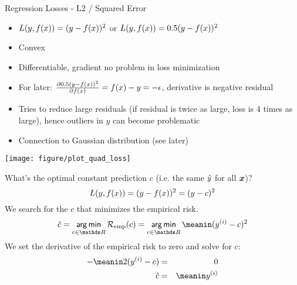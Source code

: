\begin{vbframe}{Regression Losses - L2 / Squared Error}
\begin{itemize}
\item $L(y, f(x)) = (y-f(x))^2$ or $L(y, f(x)) = 0.5 (y-f(x))^2$
\item Convex
\item Differentiable, gradient no problem in loss minimization
\item For later: $\frac{\partial{0.5 (y-f(x))^2}}{\partial f(x)} = f(x) - y = - \epsilon$, derivative is negative residual
\item Tries to reduce large residuals (if residual is twice as large, loss is 4 times as large), hence
  outliers in $y$ can become problematic
\item Connection to Gaussian distribution (see later)
\end{itemize}

\begin{knitrout}\scriptsize
{}\color{fgcolor}

{\centering \texttt{[image: figure/plot\_quad\_loss]} 
}



\end{knitrout}
\framebreak


What's the optimal constant prediction $c$ (i.e. the same $\hat{y}$ for all $\bm{x}$)?
$$L(y, f(x)) = (y-f(x))^2 = (y - c)^2$$
We search for the $c$ that minimizes the empirical risk.
$$  \hat{c} = \argmin_{c \in \R}\riske(c)  =  \argmin_{c \in \R} \meanin  (\yi-c)^2 $$
We set the derivative of the empirical risk to zero and solve for $c$:
\begin{eqnarray*}
 -\meanin 2(\yi - c) &=& 0 \cr
\hat{c} &=& \meanin \yi
\end{eqnarray*}

%
%
\end{vbframe}

